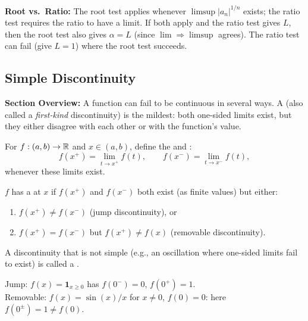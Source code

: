 \documentclass[../master/master.tex]{subfiles}
\begin{document}
\begin{notebox}
\textbf{Root vs.\ Ratio:} The root test applies whenever $\limsup |a_n|^{1/n}$ exists; the ratio test requires the ratio to have a limit. If both apply and the ratio test gives $L$, then the root test also gives $\alpha = L$ (since $\lim \Rightarrow \limsup$ agrees). The ratio test can fail (give $L=1$) where the root test succeeds.
\end{notebox}

\subsection{Simple Discontinuity}

\begin{summarybox}
\textbf{Section Overview:} A function can fail to be continuous in several ways. A  (also called a \emph{first-kind} discontinuity) is the mildest: both one-sided limits exist, but they either disagree with each other or with the function's value.
\end{summarybox}

\begin{definition}
For $f: (a,b) \to \mathbb{R}$ and $x \in (a,b)$, define the  and :
\[
    f(x^+) = \lim_{t \to x^+} f(t), \qquad f(x^-) = \lim_{t \to x^-} f(t),
\]
whenever these limits exist.
\end{definition}

\begin{definition}
$f$ has a  at $x$ if $f(x^+)$ and $f(x^-)$ both exist (as finite values) but either:
\begin{enumerate}
    \item $f(x^+) \neq f(x^-)$ \quad (jump discontinuity), or
    \item $f(x^+) = f(x^-)$ but $f(x^+) \neq f(x)$ \quad (removable discontinuity).
\end{enumerate}
A discontinuity that is not simple (e.g., an oscillation where one-sided limits fail to exist) is called a .
\end{definition}

\begin{example}
Jump: $f(x) = \mathbf{1}_{x \geq 0}$ has $f(0^-) = 0$, $f(0^+) = 1$. \\
Removable: $f(x) = \sin(x)/x$ for $x \neq 0$, $f(0) = 0$: here $f(0^{\pm}) = 1 \neq f(0)$.
\end{example}
\end{document}
